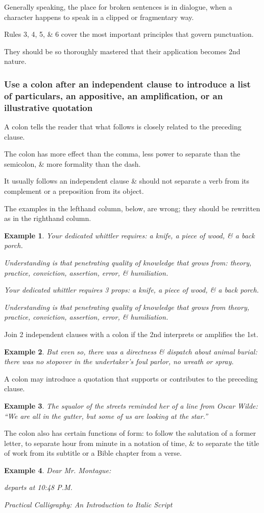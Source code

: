 \documentclass{article}
\newtheorem{example}{Example}
\begin{document}
Generally speaking, the place for broken sentences is in dialogue, when a character happens to speak in a clipped or fragmentary way.

%
Rules 3, 4, 5, \& 6 cover the most important principles that govern punctuation.

They should be so thoroughly mastered that their application becomes 2nd nature.


\subsubsection{Use a colon after an independent clause to introduce a list of particulars, an appositive, an amplification, or an illustrative quotation}
A colon tells the reader that what follows is closely related to the preceding clause.

The colon has more effect than the comma, less power to separate than the semicolon, \& more formality than the dash.

It usually follows an independent clause \& should not separate a verb from its complement or a preposition from its object.

The examples in the lefthand column, below, are wrong; they should be rewritten as in the righthand column.
\begin{example}
	Your dedicated whittler requires: a knife, a piece of wood, \& a back porch.
	
	Understanding is that penetrating quality of knowledge that grows from: theory, practice, conviction, assertion, error, \& humiliation.
	
	Your dedicated whittler requires 3 props: a knife, a piece of wood, \& a back porch.
	
	Understanding is that penetrating quality of knowledge that grows from theory, practice, conviction, assertion, error, \& humiliation.
\end{example}
Join 2 independent clauses with a colon if the 2nd interprets or amplifies the 1st.
\begin{example}
	But even so, there was a directness \& dispatch about animal burial: there was no stopover in the undertaker's foul parlor, no wreath or spray.
\end{example}
A colon may introduce a quotation that supports or contributes to the preceding clause.
\begin{example}
	The squalor of the streets reminded her of a line from Oscar Wilde: ``We are all in the gutter, but some of us are looking at the star.''
\end{example}
The colon also has certain functions of form: to follow the salutation of a former letter, to separate hour from minute in a notation of time, \& to separate the title of work from its subtitle or a Bible chapter from a verse.
\begin{example}
	Dear Mr. Montague:
	
	departs at 10:48 P.M.
	
	Practical Calligraphy: An Introduction to Italic Script
\end{example}
\end{document}
